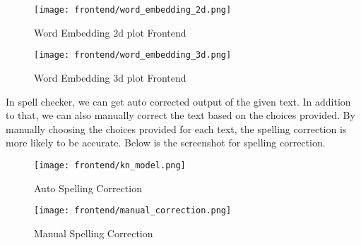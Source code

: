 \begin{figure}[H]
    \centering
    \texttt{[image: frontend/word\_embedding\_2d.png]}
    \caption{Word Embedding 2d plot Frontend}
    \label{fig: Word Embedding 2d plot Frontend}
\end{figure}

\begin{figure}[H]
    \centering
    \texttt{[image: frontend/word\_embedding\_3d.png]}
    \caption{Word Embedding 3d plot Frontend}
    \label{fig: Word Embedding 3d plot Frontend}
\end{figure}

In spell checker, we can get auto corrected output of the given text. In addition to that, we can also manually correct the text  based on the choices provided. By manually choosing the choices provided for each text, the spelling correction is more likely to be accurate. Below is the screenshot for spelling correction.

\begin{figure}[H]
    \centering
    \texttt{[image: frontend/kn\_model.png]}
    \caption{Auto Spelling Correction}
    \label{fig: Auto Spelling Correction}
\end{figure}

\begin{figure}[H]
    \centering
    \texttt{[image: frontend/manual\_correction.png]}
    \caption{Manual Spelling Correction}
    \label{fig: Manual Spelling Correction}
\end{figure}
